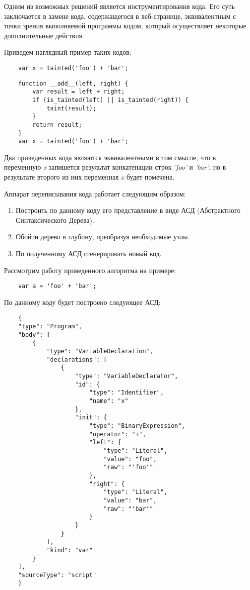 Одним из возможных решений является инструментирования кода. Его суть заключается в замене кода, содержащегося в веб-странице, эквивалентным с точки зрения выполняемой программы кодом, который осуществляет некоторые дополнительные действия.


Приведем наглядный пример таких кодов:

\bigskip
\begin{lstlisting}
	var x = tainted('foo') + 'bar';
\end{lstlisting}


\begin{lstlisting}
	function __add__(left, right) {
		var result = left + right;
		if (is_tainted(left) || is_tainted(right)) {
			taint(result);
		}
		return result;
	}
	var x = tainted('foo') + 'bar';
\end{lstlisting}


Два приведенных кода являются эквивалентными в том смысле, что в переменную \textit{x} запишется результат конкатенации строк \textit{'foo'} и \textit{'bar'}, но в результате второго из них переменная \textit{x} будет помечена.


Аппарат переписывания кода работает следующим образом:


\begin{enumerate}
	\item Построить по данному коду его представление в виде АСД (Абстрактного Синтаксического Дерева).
	\item Обойти дерево в глубину, преобразуя необходимые узлы.
	\item По полученному АСД сгенерировать новый код.
\end{enumerate}


Рассмотрим работу приведенного алгоритма на примере:

\bigskip
\begin{lstlisting}
	var a = 'foo' + 'bar';
\end{lstlisting}


По данному коду будет построено следующее АСД:

\bigskip
\begin{lstlisting}
	{
    "type": "Program",
    "body": [
        {
            "type": "VariableDeclaration",
            "declarations": [
                {
                    "type": "VariableDeclarator",
                    "id": {
                        "type": "Identifier",
                        "name": "x"
                    },
                    "init": {
                        "type": "BinaryExpression",
                        "operator": "+",
                        "left": {
                            "type": "Literal",
                            "value": "foo",
                            "raw": "'foo'"
                        },
                        "right": {
                            "type": "Literal",
                            "value": "bar",
                            "raw": "'bar'"
                        }
                    }
                }
            ],
            "kind": "var"
        }
    ],
    "sourceType": "script"
	}
\end{lstlisting}


